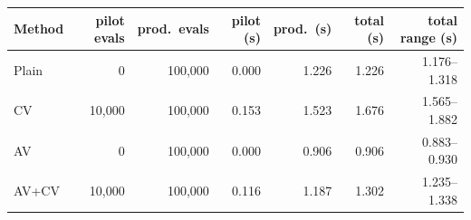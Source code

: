 \begin{tabular}{lrrrrrr}
\toprule
Method & pilot evals & prod.\ evals & pilot (s) & prod.\ (s) & total (s) & total range (s) \\
\midrule
Plain & 0 & 100,000 & 0.000 & 1.226 & 1.226 & 1.176--1.318 \\
CV & 10,000 & 100,000 & 0.153 & 1.523 & 1.676 & 1.565--1.882 \\
AV & 0 & 100,000 & 0.000 & 0.906 & 0.906 & 0.883--0.930 \\
AV+CV & 10,000 & 100,000 & 0.116 & 1.187 & 1.302 & 1.235--1.338 \\
\bottomrule
\end{tabular}
